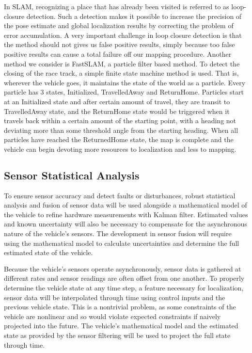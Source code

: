 \documentclass[10pt, onecolumn, draftclsnofoot, letterpaper,compsoc]{IEEEtran}
\begin{document}
In SLAM, recognizing a place that has already been visited is referred to as loop-closure detection. Such a detection makes it possible to increase the precision of the pose estimate and global localization results by correcting the problem of error accumulation. A very important challenge in loop closure detection is that the method should not gives us false positive results, simply because too false positive results can cause a total failure off our mapping procedure. Another method we consider is FastSLAM, a particle filter based method. To detect the closing of the race track, a simple finite state machine method is used. That is, wherever the vehicle goes, it maintains the state of the world as a particle. Every particle has 3 states, Initialized, TravelledAway and ReturnHome. Particles start at an Initialized state and after certain amount of travel, they are transit to TravelledAway state, and the ReturnHome state would be triggered when it travels back within a certain amount of the starting point, with a heading not deviating more than some threshold angle from the starting heading. When all particles have reached the ReturnedHome state, the map is complete and the vehicle can begin devoting more resources to localization and less to mapping.

\subsection{Sensor Statistical Analysis}

To ensure sensor accuracy and detect faults or disturbances, robust statistical analysis and fusion of sensor data will be used alongside a mathematical model of the vehicle to refine hardware measurements with Kalman filter. Estimated values and known uncertainty will also be necessary to compensate for the asynchronous nature of the vehicle's sensors. The development in sensor fusion will require using the mathematical model to calculate uncertainties and determine the full estimated state of the vehicle.

Because the vehicle's sensors operate asynchronously, sensor data is gathered at different rates and sensor readings are often offset from one another. To properly determine the vehicle state at any time step, a feature necessary for localization, sensor data will be interpolated through time using control inputs and the previous vehicle state. This is a nontrivial problem, as some constraints of the vehicle are nonlinear and so would violate expected constraints if naively projected into the future. The vehicle’s mathematical model and the estimated state as provided by the sensor filtering will be used to project the full state through time.
\end{document}

